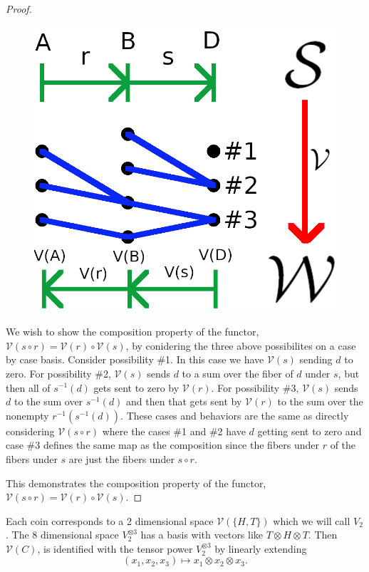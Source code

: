 \documentclass[12pt,a4paper]{article}
\theoremstyle{myrule}
\theoremstyle{postulate}
\theoremstyle{definition}
\begin{document}
\begin{proof}
\begin{figure}[h]
\centering
\includegraphics[scale=1.0]{functor.png}
\end{figure}
  
  We wish to show the composition property of the functor, $\mathcal{V}(s \circ r) = \mathcal{V}(r) \circ \mathcal{V}(s)$, by conidering the three above possibilites on a case by case basis.  Consider possibility \#1.  In this case we have $\mathcal{V}(s)$ sending $d$ to zero.  For possibility \#2, $\mathcal{V}(s)$ sends $d$ to a sum over the fiber of $d$ under $s$, but then all of $s^{-1}(d)$ gets sent to zero by $\mathcal{V}(r)$.  For possibility \#3, $\mathcal{V}(s)$ sends $d$ to the sum over $s^{-1}(d)$ and then that gets sent by $\mathcal{V}(r)$ to the sum over the nonempty $r^{-1}(s^{-1}(d))$.  These cases and behaviors are the same as directly considering $\mathcal{V}(s \circ r)$ where the cases \#1 and \#2 have $d$ getting sent to zero and case \#3 defines the same map as the composition since the fibers under $r$ of the fibers under $s$ are just the fibers under $s \circ r$.

  This demonstrates the composition property of the functor, $\mathcal{V}(s \circ r) = \mathcal{V}(r) \circ \mathcal{V}(s)$.
\end{proof}

Each coin corresponds to a 2 dimensional space $\mathcal{V}(\{H,T\})$ which we will call $V_2$.  The 8 dimensional space $V_2 ^ {\otimes 3}$ has a basis with vectors like $T \otimes H \otimes T$.  Then $\mathcal{V}(C)$, is identified with the tensor power $V_2^{\otimes 3}$ by linearly extending
\[
(x_1,x_2,x_3) \mapsto x_1 \otimes x_2 \otimes x_3.
\]
\end{document}
